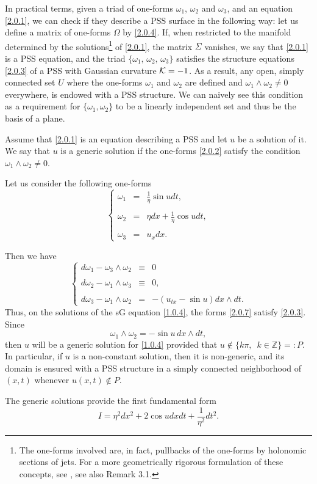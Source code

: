 \documentclass{cimart}
\newcommand{\ba}{\begin{array}}
\newcommand{\bb}{\begin{equation}}
\newcommand{\ea}{\end{array}}
\newcommand{\ee}{\end{equation}}
\begin{document}
In practical terms, given a triad of one-forms $\omega_1$, $\omega_2$ and $\omega_3$, and an equation \eqref{2.0.1}, we can check if they describe a PSS surface in the following way: let us define a matrix of one-forms $\Omega$ by \eqref{2.0.4}. If, when restricted to the manifold determined by the  solutions\footnote{The one-forms involved are, in fact, pullbacks of the one-forms by holonomic sections of jets. For a more geometrically rigorous formulation of these concepts, see \cite[Section II]{reyes2000jmp}, see also Remark 3.1.} of \eqref{2.0.1}, the matrix $\Sigma$ vanishes, we say that \eqref{2.0.1} is a PSS equation, and the triad $\{\omega_1,\, \omega_2,\, \omega_3\}$ satisfies the structure equations \eqref{2.0.3} of a PSS with Gaussian curvature ${\cal K}=-1$. As a result, any open, simply connected set $U$ where the one-forms $\omega_1$ and $\omega_2$ are defined and $\omega_1\wedge\omega_2\neq0$ everywhere, is endowed with a PSS structure. We can naively see this condition as a requirement for $\{\omega_1,\omega_2\}$ to be a linearly independent set and thus be the basis of a plane.

\begin{definition}\label{def2.2}
   Assume that \eqref{2.0.1} is an equation describing a PSS and let $u$ be a solution of it. We say that $u$ is a generic solution if the one-forms \eqref{2.0.2} satisfy the condition $\omega_1\wedge\omega_2\neq0$.
\end{definition}

\begin{example}
Let us consider the following one-forms
\bb\label{2.0.7}
\left\{
\ba{lcl}
\omega_1&=&{\frac{1}{\eta}\sin{u}dt,}\\
\\
\omega_2&=&{\eta dx+\frac{1}{\eta}\cos{u}dt},\\
\\
\omega_3&=& u_xdx.
\ea
\right.
\ee

Then we have
$$
\left\{
\ba{lcl}
d\omega_1-\omega_3\wedge\omega_2&\equiv&{0}\\
\\
d\omega_2-\omega_1\wedge\omega_3&\equiv&{0},\\
\\
d\omega_3-\omega_1\wedge\omega_2&=&-(u_{tx}-\sin{u})dx\wedge dt.
\ea
\right.
$$
Thus, on the solutions of the sG equation \eqref{1.0.4}, the forms \eqref{2.0.7} satisfy \eqref{2.0.3}. Since 
$$
\omega_1\wedge\omega_2=-\sin{u}\,dx\wedge dt,
$$
then $u$ will be a generic solution for \eqref{1.0.4} provided that $u\notin\{k\pi,\,\,\,k\in\mathbb{Z}\}=:P$. In particular, if $u$ is a non-constant solution, then it is non-generic, and its domain is ensured with a PSS structure in a simply connected neighborhood of $(x,t)$ whenever $u(x,t)\notin P$.

The generic solutions provide the first fundamental form
$$
I=\eta^2dx^2+2\cos{u}dxdt+\frac{1}{\eta^2}dt^2.
$$
\end{example}
\end{document}
